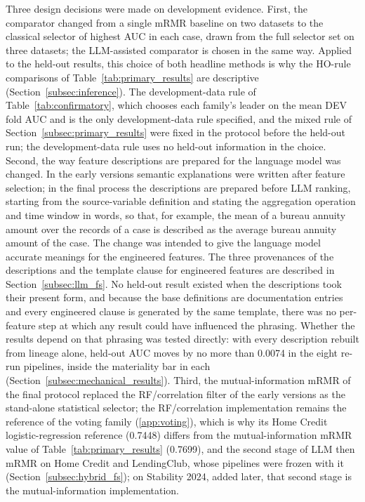 \documentclass[final,5p,twocolumn]{elsarticle}
\begin{document}
Three design decisions were made on development evidence. First, the comparator changed from a single mRMR baseline on two datasets to the classical selector of highest AUC in each case, drawn from the full selector set on three datasets; the LLM-assisted comparator is chosen in the same way. Applied to the held-out results, this choice of both headline methods is why the HO-rule comparisons of Table~\ref{tab:primary_results} are descriptive (Section~\ref{subsec:inference}). The development-data rule of Table~\ref{tab:confirmatory}, which chooses each family's leader on the mean DEV fold AUC and is the only development-data rule specified, and the mixed rule of Section~\ref{subsec:primary_results} were fixed in the protocol before the held-out run; the development-data rule uses no held-out information in the choice. Second, the way feature descriptions are prepared for the language model was changed. In the early versions semantic explanations were written after feature selection; in the final process the descriptions are prepared before LLM ranking, starting from the source-variable definition and stating the aggregation operation and time window in words, so that, for example, the mean of a bureau annuity amount over the records of a case is described as the average bureau annuity amount of the case. The change was intended to give the language model accurate meanings for the engineered features. The three provenances of the descriptions and the template clause for engineered features are described in Section~\ref{subsec:llm_fs}. No held-out result existed when the descriptions took their present form, and because the base definitions are documentation entries and every engineered clause is generated by the same template, there was no per-feature step at which any result could have influenced the phrasing. Whether the results depend on that phrasing was tested directly: with every description rebuilt from lineage alone, held-out AUC moves by no more than 0.0074 in the eight re-run pipelines, inside the materiality bar in each (Section~\ref{subsec:mechanical_results}). Third, the mutual-information mRMR of the final protocol replaced the RF/correlation filter of the early versions as the stand-alone statistical selector; the RF/correlation implementation remains the reference of the voting family (\ref{app:voting}), which is why its Home Credit logistic-regression reference (0.7448) differs from the mutual-information mRMR value of Table~\ref{tab:primary_results} (0.7699), and the second stage of LLM then mRMR on Home Credit and LendingClub, whose pipelines were frozen with it (Section~\ref{subsec:hybrid_fs}); on Stability 2024, added later, that second stage is the mutual-information implementation.
\end{document}
